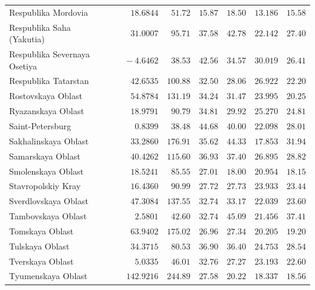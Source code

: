 \documentclass[alpha-refs]{wiley-article-05g}
\begin{document}
{\begin{longtable}{lcccccc}
Respublika Mordovia  & $\phantom{0}\phantom{-}18.6844$ & $\phantom{0}51.72$ & $15.87$ & $18.50$ & $13.186$ & $15.58$ \\
Respublika Saha (Yakutia)  & $\phantom{0}\phantom{-}31.0007$ & $\phantom{0}95.71$ & $37.58$ & $42.78$ & $22.142$ & $27.40$ \\
Respublika Severnaya Osetiya  & $\phantom{00}-4.6462$ & $\phantom{0}38.53$ & $42.56$ & $34.57$ & $30.019$ & $26.41$ \\
Respublika Tatarstan  & $\phantom{0}\phantom{-}42.6535$ & $100.88$ & $32.50$ & $28.06$ & $26.922$ & $22.20$ \\
Rostovskaya Oblast  & $\phantom{0}\phantom{-}54.8784$ & $131.19$ & $34.24$ & $31.47$ & $23.995$ & $20.25$ \\
Ryazanskaya Oblast  & $\phantom{0}\phantom{-}18.9791$ & $\phantom{0}90.79$ & $34.81$ & $29.92$ & $25.270$ & $24.81$ \\
Saint-Petersburg  & $\phantom{00}\phantom{-}0.8399$ & $\phantom{0}38.48$ & $44.68$ & $40.00$ & $22.098$ & $28.01$ \\
Sakhalinskaya Oblast  & $\phantom{0}\phantom{-}33.2860$ & $176.91$ & $35.62$ & $44.33$ & $17.853$ & $31.94$ \\
Samarskaya Oblast  & $\phantom{0}\phantom{-}40.4262$ & $115.60$ & $36.93$ & $37.40$ & $26.895$ & $28.82$ \\
Smolenskaya Oblast  & $\phantom{0}\phantom{-}18.5241$ & $\phantom{0}85.55$ & $27.01$ & $18.00$ & $20.954$ & $18.15$ \\
Stavropolskiy Kray  & $\phantom{0}\phantom{-}16.4360$ & $\phantom{0}90.99$ & $27.72$ & $27.73$ & $23.933$ & $23.44$ \\
Sverdlovskaya Oblast  & $\phantom{0}\phantom{-}47.3084$ & $137.55$ & $32.74$ & $33.17$ & $22.039$ & $23.60$ \\
Tambovskaya Oblast  & $\phantom{00}\phantom{-}2.5801$ & $\phantom{0}42.60$ & $32.74$ & $45.09$ & $21.456$ & $37.41$ \\
Tomskaya Oblast  & $\phantom{0}\phantom{-}63.9402$ & $175.02$ & $26.96$ & $27.34$ & $20.205$ & $19.20$ \\
Tulskaya Oblast  & $\phantom{0}\phantom{-}34.3715$ & $\phantom{0}80.53$ & $36.90$ & $36.40$ & $24.753$ & $28.54$ \\
Tverskaya Oblast  & $\phantom{00}\phantom{-}5.0335$ & $\phantom{0}46.01$ & $32.76$ & $27.27$ & $23.193$ & $22.60$ \\
Tyumenskaya Oblast  & $\phantom{-}142.9216$ & $244.89$ & $27.58$ & $20.22$ & $18.337$ & $18.56$ \\

\end{longtable}}
\end{document}
